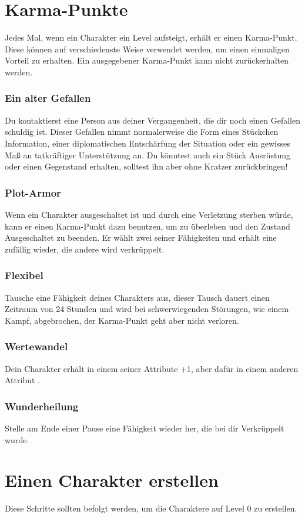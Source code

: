 \section{Karma-Punkte}
Jedes Mal, wenn ein Charakter ein Level aufsteigt, erhält er einen Karma-Punkt. Diese können auf verschiedenste Weise verwendet werden, um einen einmaligen Vorteil zu erhalten. Ein ausgegebener Karma-Punkt kann nicht zurückerhalten werden.
\subsubsection{Ein alter Gefallen}
Du kontaktierst eine Person aus deiner Vergangenheit, die dir noch einen Gefallen schuldig ist. Dieser Gefallen nimmt normalerweise die Form eines Stückchen Information, einer diplomatischen Entschärfung der Situation oder ein gewisses Maß an tatkräftiger Unterstützung an. Du könntest auch ein Stück Ausrüstung oder einen Gegenstand erhalten, solltest ihn aber ohne Kratzer zurückbringen!
\subsubsection{Plot-Armor} 
Wenn ein Charakter ausgeschaltet ist und durch eine Verletzung sterben würde, kann er einen Karma-Punkt dazu benutzen, um zu überleben und den Zustand \glqq Ausgeschaltet\grqq{} zu beenden. Er wählt zwei seiner Fähigkeiten und erhält eine zufällig wieder, die andere wird verkrüppelt.
\subsubsection{Flexibel} 
Tausche eine Fähigkeit deines Charakters aus, dieser Tausch dauert einen Zeitraum von 24 Stunden und wird bei schwerwiegenden Störungen, wie einem Kampf, abgebrochen, der Karma-Punkt geht aber nicht verloren.
\subsubsection{Wertewandel} 
Dein Charakter erhält in einem seiner Attribute \glqq +1\grqq{}, aber dafür in einem anderen Attribut \grqq{}.
\subsubsection{Wunderheilung}
Stelle am Ende einer Pause eine Fähigkeit wieder her, die bei dir Verkrüppelt wurde.
\section{Einen Charakter erstellen}
Diese Schritte sollten befolgt werden, um die Charaktere auf Level 0 zu erstellen.

